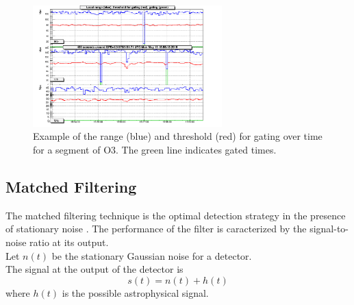 %
\begin{figure}[ht]
  \centering
  \includegraphics[width=0.65\textwidth]{sectionMBTA/GatingZoom.png}
  \caption{Example of the range (blue) and threshold (red) for gating over time for a segment of O3. The green line indicates gated times.}
  \label{fig:range_glitch}
\end{figure}
%




\subsection{Matched Filtering}
\label{sec:matched_filter}
%
%

The matched filtering technique is the optimal detection strategy in the presence of stationary noise \cite{signal_detection}.
The performance of the filter is caracterized by the signal-to-noise ratio at its output.\\
Let $n(t)$ be the stationary Gaussian noise for a detector.\\
The signal at the output of the detector is 
\begin{equation}
    s(t) = n(t) + h(t)
\end{equation}
where $h(t)$ is the possible astrophysical signal.

